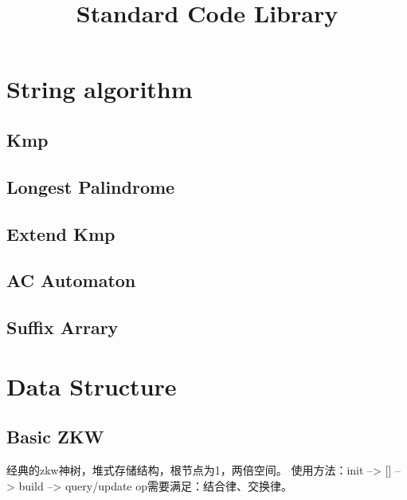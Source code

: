 \documentclass[twoside, UTF8]{article}
\title{Standard Code Library}
\author{}
\newcommand\blankpage{ \null\thispagestyle{empty}\addtocounter{page}{-1}\newpage }
\begin{document}
	\maketitle
	\afterpage{\blankpage}

	\newpage
	\tableofcontents

	\newpage
	\section{String algorithm}
		\subsection{Kmp}
			
		\subsection{Longest Palindrome}
			
		\subsection{Extend Kmp}
			
		\subsection{AC Automaton}
			
		\subsection{Suffix Arrary}
			
	\newpage
	\section{Data Structure}
		\subsection{Basic ZKW}
			\begin{flushleft}
				经典的zkw神树，堆式存储结构，根节点为1，两倍空间。
				\linebreak 使用方法：init --> [] --> build --> query/update
				\linebreak op需要满足：结合律、交换律。
			\end{flushleft}
			
\end{document}
